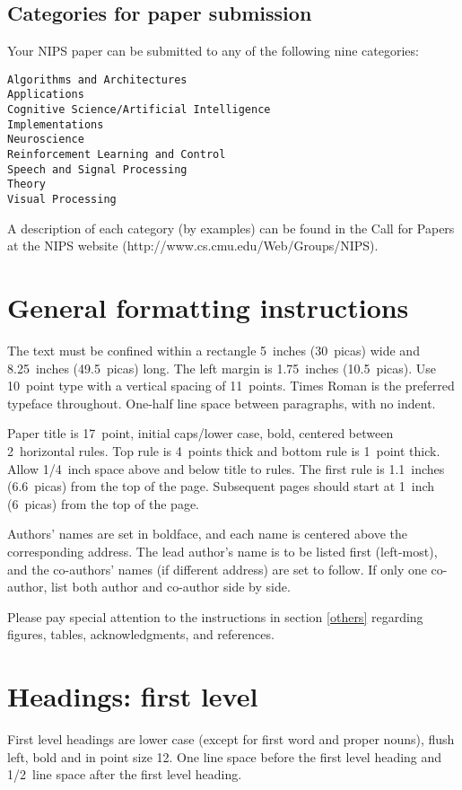 \subsection{Categories for paper submission}
Your NIPS paper can be submitted to any of the following nine 
categories: 

\begin{verbatim}
Algorithms and Architectures
Applications
Cognitive Science/Artificial Intelligence
Implementations
Neuroscience
Reinforcement Learning and Control
Speech and Signal Processing
Theory
Visual Processing
\end{verbatim}

A description of each category (by examples) can 
be found in the Call for Papers at the NIPS website 
(http://www.cs.cmu.edu/Web/Groups/NIPS). 

\section{General formatting instructions} 
\label{gen_inst}
The text must be confined within a rectangle 5~inches (30~picas) wide 
and 8.25~inches (49.5~picas) long. The left margin is
1.75~inches (10.5~picas). Use 10~point type with a vertical spacing
of 11~points. Times Roman is the preferred typeface throughout.
One-half line space between paragraphs, with no indent.

Paper title is 17~point, initial caps/lower case, bold, centered between
2~horizontal rules.  Top rule is 4~points thick and bottom rule is
1~point thick. Allow 1/4~inch space above and below title to rules.
The first rule is 1.1~inches (6.6~picas) from the top of the page.
Subsequent pages should start at 1~inch (6~picas) from the top of
the page. 

Authors' names are set in boldface, and each name is centered above
the corresponding address.   The lead author's name
is to be listed first (left-most), and the co-authors' names (if
different address) are set to follow.  If only one co-author,
list both  author and co-author side by side.

Please pay special
attention to the instructions in section \ref{others}  regarding
figures, tables, acknowledgments, and references.


\section{Headings: first level}
\label{headings}

First level headings are lower case (except for first word and proper 
nouns), flush left, bold and in point
size 12. One line space before the first level heading and 1/2~line
space after the first level heading.

